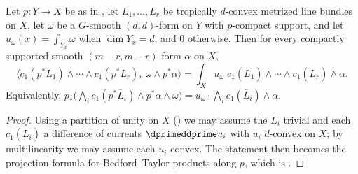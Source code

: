 \begin{proposition}
\label{prop:ch17-relative-pairing}
Let $p:Y\to X$ be as in , let
$\overline L_1,\dots,\overline L_r$ be tropically $d$-convex metrized
line bundles on $X$, let $\omega$ be a $G$-smooth $(d,d)$-form on
$Y$ with $p$-compact support, and let
$u_\omega(x)=\int_{Y_x}\omega$ when $\dim Y_x=d$, and $0$ otherwise.
Then for every compactly supported smooth $(m-r,m-r)$-form $\alpha$ on
$X$,
\[
 \bigl\langle c_1(p^*\overline L_1)\wedge\cdots\wedge
   c_1(p^*\overline L_r),\ \omega\wedge p^*\alpha\bigr\rangle
 =\int_Xu_\omega\;
   c_1(\overline L_1)\wedge\cdots\wedge c_1(\overline L_r)\wedge\alpha .
\]
Equivalently,
$p_*\bigl(\bigwedge_ic_1(p^*\overline L_i)\wedge p^*\alpha\wedge\omega\bigr)
 =u_\omega\cdot\bigwedge_ic_1(\overline L_i)\wedge\alpha$.
\end{proposition}

\begin{proof}
Using a partition of unity on $X$
() we may assume the $L_i$ trivial and
each $c_1(\overline L_i)$ a difference of currents $\dprimeddprime u_i$
with $u_i$ $d$-convex on $X$; by multilinearity we may assume each
$u_i$ convex.  The statement then becomes the projection formula for
Bedford--Taylor products along $p$, which is
.
\end{proof}


